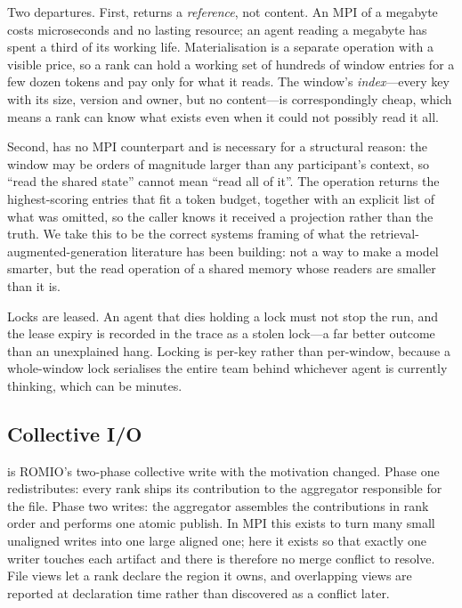 Two departures. First,  returns a \emph{reference}, not content. An
MPI  of a megabyte costs microseconds and no lasting resource; an
agent reading a megabyte has spent a third of its working life.
Materialisation is a separate operation with a visible price, so a rank can
hold a working set of hundreds of window entries for a few dozen tokens and
pay only for what it reads. The window's \emph{index}---every key with its
size, version and owner, but no content---is correspondingly cheap, which
means a rank can know what exists even when it could not possibly read it
all.

Second,  has no MPI counterpart and is necessary for a
structural reason: the window may be orders of magnitude larger than any
participant's context, so ``read the shared state'' cannot mean ``read all
of it''. The operation returns the highest-scoring entries that fit a token
budget, together with an explicit list of what was omitted, so the caller
knows it received a projection rather than the truth. We take this to be the
correct systems framing of what the retrieval-augmented-generation
literature has been building: not a way to make a model smarter, but the
read operation of a shared memory whose readers are smaller than it is.

Locks are leased. An agent that dies holding a lock must not stop the run,
and the lease expiry is recorded in the trace as a stolen lock---a far
better outcome than an unexplained hang. Locking is per-key rather than
per-window, because a whole-window lock serialises the entire team behind
whichever agent is currently thinking, which can be minutes.

\subsection{Collective I/O}

 is ROMIO's two-phase collective write with the
motivation changed. Phase one redistributes: every rank ships its
contribution to the aggregator responsible for the file. Phase two writes:
the aggregator assembles the contributions in rank order and performs one
atomic publish. In MPI this exists to turn many small unaligned writes into
one large aligned one; here it exists so that exactly one writer touches
each artifact and there is therefore no merge conflict to resolve. File
views let a rank declare the region it owns, and overlapping views are
reported at declaration time rather than discovered as a conflict later.

